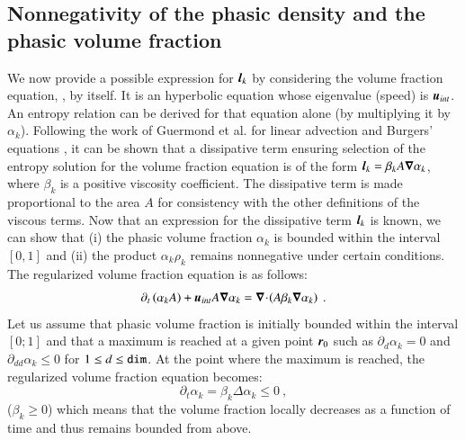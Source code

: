 \subsection{Nonnegativity of the phasic density and the phasic volume fraction}\label{sct:positivity}
%
We now provide a possible expression for $\boldsymbol l_k$ by considering the volume fraction equation, , by itself. 
It is an hyperbolic equation
whose eigenvalue (speed) is $\boldsymbol u_{int}$. An entropy relation can be derived for that equation alone (by multiplying it by $\alpha_k$).
Following the work of Guermond et al. for linear advection and Burgers' equations \cite{jlg_EVM_JCP2011,jlg_EVM_CSE2011}, it can be shown that a dissipative term ensuring 
selection of the entropy solution for the volume fraction equation is of the form $\boldsymbol l_k = \beta_k A \boldsymbol\nabla \alpha_k $, where $\beta_k$
is a positive viscosity coefficient. The dissipative term is made proportional to the area $A$ for consistency with 
the other definitions of the viscous terms. Now that an expression for the dissipative term $\boldsymbol l_k$ is known, we can show that (i) the phasic
volume fraction $\alpha_k$ is bounded within the interval $[0,1]$ and (ii) the product $\alpha_k \rho_k$ remains nonnegative under certain conditions.
The regularized volume fraction equation is as follows:
%
\begin{equation}\label{eq:final-reg-vf-equ}
\partial_t \left( \alpha_k A \right) + \boldsymbol u_{int} A \boldsymbol\nabla \alpha_k= \boldsymbol\nabla\! \cdot \! \left( A \beta_k \boldsymbol\nabla \alpha_k \right) \ .
\end{equation}
%
Let us assume that phasic volume fraction is initially bounded within the interval $[0;1]$ and that a maximum is reached at a given point $\boldsymbol r_0$
such as $ \partial_d \alpha_k = 0$ and $\partial_{dd} \alpha_k \leq 0$ for $1\le d \le {\tt dim}$. 
  
At the point where the maximum is reached, the regularized volume fraction equation becomes:
%
\begin{equation}\label{eq:final-reg-vf-equ-max}
\partial_t \alpha_k = \beta_k \Delta \alpha_k \leq 0 \ ,
\end{equation}
%
($\beta_k \ge 0$) which means that the volume fraction locally decreases as a function of time and thus remains bounded from above. 
